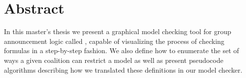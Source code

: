 \section*{Abstract}

In this master's thesis we present a graphical model checking tool for group announcement logic called \cname, capable of visualizing the process of checking formulas in a step-by-step fashion. We also define how to enumerate the set of ways a given coalition can restrict a model as well as present pseudocode algorithms describing how we translated these definitions in our model checker. 

